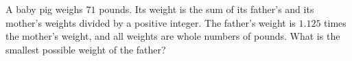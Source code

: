 A baby pig weighs $71$ pounds. Its weight is the sum of its father's and its mother's weights divided by a positive integer. The father's weight is $1.125$ times the mother's weight, and all weights are whole numbers of pounds. What is the smallest possible weight of the father?
